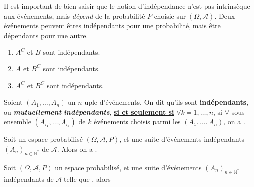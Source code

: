 \documentclass[10pt, french]{report}
\begin{document}
\begin{multicols*}{2}
\begin{definitionNOHFILL}
Il est important de bien saisir que le notion d'indépendance n'est pas intrinsèque aux événements, mais \textit{dépend} de la probabilité $P$ choisie sur $(\Omega, \mathcal{A})$. Deux événements peuvent êtres indépendants pour une probabilité, \underline{mais être dépendants pour une autre}.

\bigskip

\begin{definitionNOHFILLprop}
\begin{enumerate}[label = \rectangled{\arabic*}{lightgray}]
	\item	$A^{C}$ et $B$ sont indépendants.
	\item	$A$ et $B^{C}$ sont indépendants.
	\item	$A^{C}$ et $B^{C}$ sont indépendants.
\end{enumerate}
\end{definitionNOHFILLprop}
\end{definitionNOHFILL}

\begin{definitionNOHFILL}
Soient $(A_{1}, \dots, A_{n})$ un $n$-uple d'événements. On dit qu'ils sont \textbf{indépendants}, ou \textbf{\textit{mutuellement indépendants}}, \underline{\textbf{si et seulement si}} $\forall k = 1, \dots, n$, si $\forall$ sous-ensemble $(A_{i_{1}}, \dots, A_{i_{k}})$ de $k$ événements choisis parmi les $(A_{1}, \dots, A_{n})$, on a .
\end{definitionNOHFILL}

\begin{definitionNOHFILL}
Soit un espace probabilisé $(\Omega, \mathcal{A}, P)$, et une suite d'événements indépendants $(A_{n})_{n \in \mathbb{N}^{\ast}}$ de $\mathcal{A}$. Alors on a .
\end{definitionNOHFILL}


\begin{definitionNOHFILL}
Soit $(\Omega, \mathcal{A}, P)$ un espace probabilisé, et une suite d'événements $(A_{n})_{n \in \mathbb{N}^{\ast}}$ indépendants de $\mathcal{A}$ telle que , alors 
\end{definitionNOHFILL}




\end{multicols*}
\end{document}
